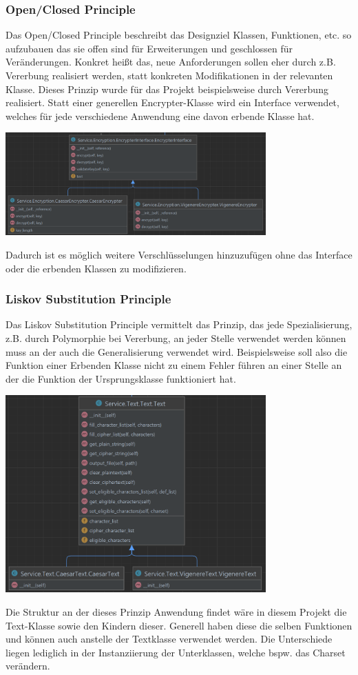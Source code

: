 \documentclass[12pt]{article}
\begin{document}
\subsubsection{Open/Closed Principle}
Das Open/Closed Principle beschreibt das Designziel Klassen, Funktionen, etc. so aufzubauen das sie offen sind für Erweiterungen und geschlossen für Veränderungen. Konkret heißt das, neue Anforderungen sollen eher durch z.B. Vererbung realisiert werden, statt konkreten Modifikationen in der relevanten Klasse. Dieses Prinzip wurde für das Projekt beispielsweise durch Vererbung realisiert. Statt einer generellen Encrypter-Klasse wird ein Interface verwendet, welches für jede verschiedene Anwendung eine davon erbende Klasse hat.
\begin{center}
	\includegraphics[width=10cm]{bilder/OCP.png}
\end{center}
Dadurch ist es möglich weitere Verschlüsselungen hinzuzufügen ohne das Interface oder die erbenden Klassen zu modifizieren.
\subsubsection{Liskov Substitution Principle}
Das Liskov Substitution Principle vermittelt das Prinzip, das jede Spezialisierung, z.B. durch Polymorphie bei Vererbung, an jeder Stelle verwendet werden können muss an der auch die Generalisierung verwendet wird. Beispielsweise soll also die Funktion einer Erbenden Klasse nicht zu einem Fehler führen an einer Stelle an der die Funktion der Ursprungsklasse funktioniert hat.
\begin{center}
	\includegraphics[width=10cm]{bilder/LSP.png}
\end{center}
Die Struktur an der dieses Prinzip Anwendung findet wäre in diesem Projekt die Text-Klasse sowie den Kindern dieser. Generell haben diese die selben Funktionen und können auch anstelle der Textklasse verwendet werden. Die Unterschiede liegen lediglich in der Instanziierung der Unterklassen, welche bspw. das Charset verändern.
\end{document}
